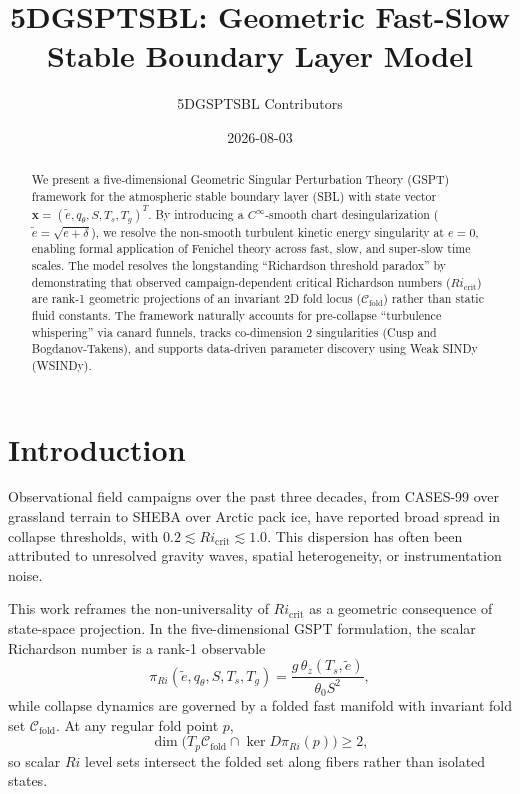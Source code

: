 \documentclass[11pt]{article}
\title{5DGSPTSBL: Geometric Fast-Slow Stable Boundary Layer Model}
\author{5DGSPTSBL Contributors}
\date{2026-08-03}
\begin{document}
\maketitle

\begin{abstract}
We present a five-dimensional Geometric Singular Perturbation Theory (GSPT) framework for the atmospheric stable boundary layer (SBL) with state vector $\mathbf{x} = (\tilde{e}, q_\theta, S, T_s, T_g)^T$. By introducing a $C^\infty$-smooth chart desingularization ($\tilde{e} = \sqrt{e + \delta}$), we resolve the non-smooth turbulent kinetic energy singularity at $e = 0$, enabling formal application of Fenichel theory across fast, slow, and super-slow time scales. The model resolves the longstanding ``Richardson threshold paradox'' by demonstrating that observed campaign-dependent critical Richardson numbers ($Ri_{\text{crit}}$) are rank-1 geometric projections of an invariant 2D fold locus ($\mathcal{C}_{\text{fold}}$) rather than static fluid constants. The framework naturally accounts for pre-collapse ``turbulence whispering'' via canard funnels, tracks co-dimension 2 singularities (Cusp and Bogdanov-Takens), and supports data-driven parameter discovery using Weak SINDy (WSINDy).
\end{abstract}

\section{Introduction}
\label{sec:introduction}

Observational field campaigns over the past three decades, from CASES-99 over grassland terrain to SHEBA over Arctic pack ice, have reported broad spread in collapse thresholds, with $0.2 \lesssim Ri_{\text{crit}} \lesssim 1.0$. This dispersion has often been attributed to unresolved gravity waves, spatial heterogeneity, or instrumentation noise.

This work reframes the non-universality of $Ri_{\text{crit}}$ as a geometric consequence of state-space projection. In the five-dimensional GSPT formulation, the scalar Richardson number is a rank-1 observable
\begin{equation}
\pi_{Ri}(\tilde{e}, q_\theta, S, T_s, T_g) = \frac{g\,\theta_z(T_s,\tilde{e})}{\theta_0 S^2},
\end{equation}
while collapse dynamics are governed by a folded fast manifold with invariant fold set $\mathcal{C}_{\mathrm{fold}}$. At any regular fold point $p$,
\begin{equation}
\dim\!\bigl(T_p\mathcal{C}_{\mathrm{fold}}\cap\ker D\pi_{Ri}(p)\bigr) \ge 2,
\end{equation}
so scalar $Ri$ level sets intersect the folded set along fibers rather than isolated states.
\end{document}
